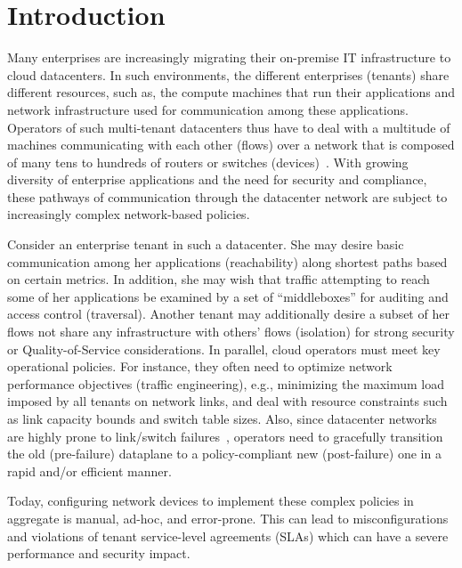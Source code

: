 \section{Introduction}

Many enterprises are increasingly migrating their on-premise IT
infrastructure to cloud datacenters. In such environments, the
different enterprises (tenants) share different resources, such as,
the compute machines that run their applications and network
infrastructure used for communication among these applications.
Operators of such multi-tenant datacenters thus have to deal with a
multitude of machines communicating with each other (flows) over a
network that is composed of many tens to hundreds of routers or
switches (devices)~\cite{mpa-imc15}. With growing diversity of
enterprise applications and the need for security and compliance,
these pathways of communication through the datacenter network are
subject to increasingly complex network-based policies.

Consider an enterprise tenant in such a datacenter. She may desire
basic communication among her applications (reachability) along
shortest paths based on certain metrics. In addition, she may wish
that traffic attempting to reach some of her applications be examined
by a set of ``middleboxes'' for auditing and access control
(traversal). Another tenant may additionally desire a subset of her
flows not share any infrastructure with others' flows (isolation) for
strong security or Quality-of-Service considerations.  In parallel,
cloud operators must meet key operational policies. For instance, they
often need to optimize network performance objectives (traffic
engineering), e.g., minimizing the maximum load imposed by all tenants
on network links, and deal with resource constraints such as link
capacity bounds and switch table sizes. Also, since datacenter
networks are highly prone to link/switch
failures~\cite{datacenterfailures}, operators need to gracefully
transition the old (pre-failure) dataplane to a policy-compliant new
(post-failure) one in a rapid and/or efficient manner.

Today, configuring network devices to implement these complex policies
in aggregate is manual, ad-hoc, and error-prone.  This
can lead to misconfigurations and violations of tenant service-level
agreements (SLAs) which can have a severe performance and security
impact.

